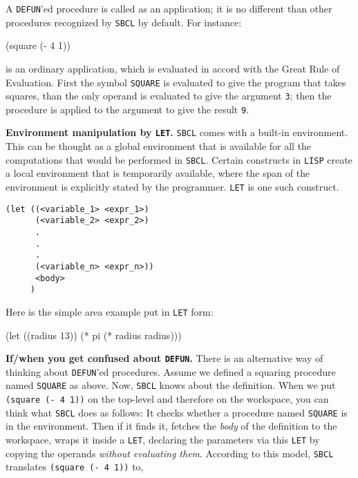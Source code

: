 \documentclass[a4paper,11pt]{article}
\begin{document}
\begin{uenum}
\begin{uenumi}
\item A \Verb+DEFUN+'ed procedure is called as an application; it is no different than other procedures recognized by \Verb+SBCL+ by default. For instance:

\begin{lispcode}
(square (- 4 1))
\end{lispcode}

is an ordinary application, which is evaluated in accord with the Great Rule of Evaluation. First the symbol \Verb+SQUARE+ is evaluated to give the program that takes squares, than the only operand is evaluated to give the argument \Verb+3+; then the procedure is applied to the argument to give the result \Verb+9+.
\end{uenumi}

\item {\bf Environment manipulation by \Verb+LET+.} \Verb+SBCL+ comes with a built-in environment. This can be thought as a global environment that is available for all the computations that would be performed in \Verb+SBCL+. Certain constructs in \Verb+LISP+ create a local environment that is temporarily available, where the span of the environment is explicitly stated by the programmer. \Verb+LET+ is one such construct.

\begin{ucodeframe}
\begin{Verbatim}
(let ((<variable_1> <expr_1>)
      (<variable_2> <expr_2>)
	  .  
	  .
	  .
      (<variable_n> <expr_n>))
      <body>
     )
\end{Verbatim}
\end{ucodeframe}

Here is the simple area example put in \Verb+LET+ form:

\begin{lispcode}
(let ((radius 13)) (* pi (* radius radius)))
\end{lispcode}
\item {\bf If/when you get confused about \Verb+DEFUN+.} There is an alternative way of thinking about \Verb+DEFUN+'ed procedures. Assume we defined a squaring procedure named \Verb+SQUARE+ as above. Now, \Verb+SBCL+ knows about the definition. When we put \Verb+(square (- 4 1))+ on the top-level and therefore on the workspace, you can think what \Verb+SBCL+ does as follows: It checks whether a procedure named \Verb+SQUARE+ is in the environment. Then if it finds it, fetches the \emph{body} of the definition to the workspace, wraps it inside a \Verb+LET+, declaring the parameters via this \Verb+LET+ by copying the operands \emph{without evaluating them}. According to this model, \Verb+SBCL+ translates \Verb+(square (- 4 1))+ to,


\end{uenum}
\end{document}
